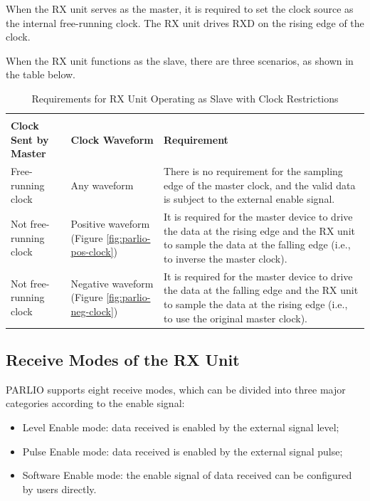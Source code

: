 \documentclass[main\_\_EN.tex]{subfiles}
\begin{document}
When the RX unit serves as the master, it is required to set the clock source as the internal free-running clock. The RX unit drives RXD on the rising edge of the clock. 

When the RX unit functions as the slave, there are three scenarios, as shown in the table below.

\begin{table}[H]
    \centering
    \caption{Requirements for RX Unit Operating as Slave with Clock Restrictions}
    \label{tab:parlio-rx-slave-restriction}
    
    \begin{tabular}{|l|p{3cm}|p{9cm}|}
    \hline
        \rowcolor{lightgray}
        \multicolumn{2}{|c|}{\textbf{Clock Restriction}} & \\
        \rowcolor{lightgray}
        \textbf{Clock Sent by Master} &\textbf{Clock Waveform} & \multirow{-2}{*}{\textbf{Requirement}} \\ \hline
        
        Free-running clock    & Any waveform  & There is no requirement for the sampling edge of the master clock, and the valid data is subject to the external enable signal. \\ \hline
        Not free-running clock  & Positive waveform (Figure \ref{fig:parlio-pos-clock}) & It is required for the master device to drive the data at the rising edge and the RX unit to sample the data at the falling edge (i.e., to inverse the master clock).    \\ \hline
        Not free-running clock  & Negative waveform (Figure \ref{fig:parlio-neg-clock})  & It is required for the master device to drive the data at the falling edge and the RX unit to sample the data at the rising edge (i.e., to use the original master clock). \\ \hline
    \end{tabular}
\end{table}


\subsection{Receive Modes of the RX Unit}

PARLIO supports eight receive modes, which can be divided into three major categories according to the enable signal:

\begin{itemize}
    \item Level Enable mode: data received is enabled by the external signal level;
    \item Pulse Enable mode: data received is enabled by the external signal pulse; 
    \item Software Enable mode: the enable signal of data received can be configured by users directly.
\end{itemize}
\end{document}
